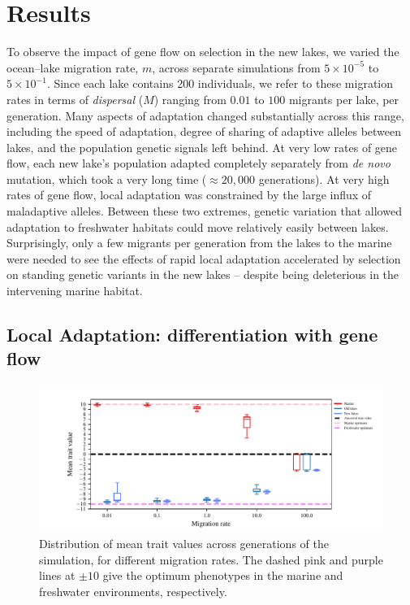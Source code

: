 \documentclass{article}
\newcommand{\jgg}[1]{\todo[linecolor=green,backgroundcolor=green!25,bordercolor=black]{#1}}
\begin{document}
\section*{Results}

To observe the impact of gene flow on selection in the new lakes, we varied the ocean--lake migration rate, $m$, across separate simulations from $5 \times 10^{-5}$ to $5 \times 10^{-1}$.
Since each lake contains 200 individuals, we refer to these migration rates in terms of \emph{dispersal} ($M$) \jgg{($D?$)} ranging from $0.01$ to $100$ migrants per lake, per generation.
Many aspects of adaptation changed substantially across this range, including the speed of adaptation, degree of sharing of adaptive alleles between lakes, and the population genetic signals left behind.
At very low rates of gene flow, each new lake's population adapted completely separately from \emph{de novo} mutation, which took a very long time ($\approx 20,000$ generations).
At very high rates of gene flow, local adaptation was constrained by the large influx of maladaptive alleles.
Between these two extremes, genetic variation that allowed adaptation to freshwater habitats could move relatively easily between lakes.
Surprisingly, only a few migrants per generation from the lakes to the marine were needed
to see the effects of rapid local adaptation accelerated by selection on standing genetic variants in the new lakes -- despite being deleterious in the intervening marine habitat.

\subsection*{Local Adaptation: differentiation with gene flow}

\begin{figure}
	\begin{center}
  		\includegraphics{Final_Plots/Pheno_Dist.pdf}
  		\caption{
            Distribution of mean trait values across generations of the simulation,
            for different migration rates.
            The dashed pink and purple lines at $\pm 10$ give the optimum phenotypes
            in the marine and freshwater environments, respectively.
		}
  		\label{fig:MeanPhenotype}
	\end{center}
\end{figure}
\end{document}
